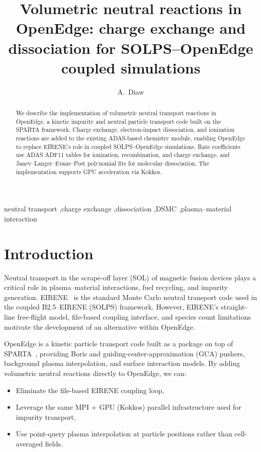 \documentclass[preprint,12pt]{elsarticle}
\begin{document}
\begin{frontmatter}
\title{Volumetric neutral reactions in OpenEdge: charge exchange and dissociation for SOLPS--OpenEdge coupled simulations}

\author[ornl]{A.~Diaw}
\address[ornl]{Oak Ridge National Laboratory, Oak Ridge, TN 37831, USA}

\begin{abstract}
We describe the implementation of volumetric neutral transport reactions in OpenEdge,
a kinetic impurity and neutral particle transport code built on the SPARTA framework.
Charge exchange, electron-impact dissociation, and ionization reactions are added to the
existing ADAS-based chemistry module, enabling OpenEdge to replace EIRENE's role in
coupled SOLPS--OpenEdge simulations. Rate coefficients use ADAS ADF11 tables for
ionization, recombination, and charge exchange, and Janev--Langer--Evans--Post polynomial
fits for molecular dissociation. The implementation supports GPU acceleration via Kokkos.
\end{abstract}

\begin{keyword}
neutral transport \sep charge exchange \sep dissociation \sep DSMC \sep plasma--material interaction
\end{keyword}
\end{frontmatter}

\section{Introduction}
\label{sec:intro}

Neutral transport in the scrape-off layer (SOL) of magnetic fusion devices plays a critical
role in plasma--material interactions, fuel recycling, and impurity generation. EIRENE~\cite{Reiter2005}
is the standard Monte Carlo neutral transport code used in the coupled B2.5--EIRENE (SOLPS)
framework. However, EIRENE's straight-line free-flight model, file-based coupling interface,
and species count limitations motivate the development of an alternative within OpenEdge.

OpenEdge is a kinetic particle transport code built as a package on top of
SPARTA~\cite{Gallis2014}, providing Boris and guiding-center-approximation (GCA) pushers,
background plasma interpolation, and surface interaction models. By adding volumetric
neutral reactions directly to OpenEdge, we can:
\begin{itemize}
  \item Eliminate the file-based EIRENE coupling loop,
  \item Leverage the same MPI + GPU (Kokkos) parallel infrastructure used for impurity transport,
  \item Use point-query plasma interpolation at particle positions rather than cell-averaged fields.
\end{itemize}
\end{document}

